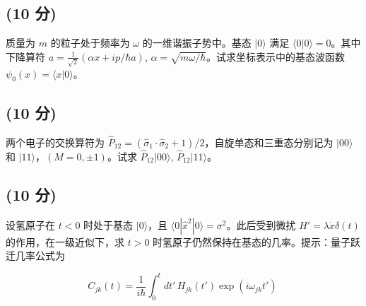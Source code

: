 \subsection{(10 分)}质量为 $m$ 的粒子处于频率为 $\omega$ 的一维谐振子势中。基态 $|0\rangle$ 满足 $\langle 0| 0\rangle = 0$。其中下降算符 $a = \frac{1}{\sqrt{2}} (\alpha x + ip/\hbar a)$, $\alpha = \sqrt{m\omega/\hbar}$。试求坐标表示中的基态波函数 $\psi_0(x) = \langle x| 0\rangle$。

\subsection{(10 分)}两个电子的交换算符为 $\hat{P}_{12} = (\hat{\sigma}_1\cdot \hat{\sigma}_2+1)/2$，自旋单态和三重态分别记为 $|00\rangle$ 和 $|11\rangle$，$(M = 0, \pm1)$。试求 $\hat{P}_{12}|00\rangle$, $\hat{P}_{12}|11\rangle$。

\subsection{(10 分)}设氢原子在 $t<0$ 时处于基态 $|0\rangle$，且 $\langle 0| \hat{x}^2 | 0\rangle = \sigma^2$。此后受到微扰 $H' = \lambda \dot{x} \delta(t)$ 的作用，在一级近似下，求 $t>0$ 时氢原子仍然保持在基态的几率。提示：量子跃迁几率公式为

$$C_{jk}(t) = \frac{1}{i\hbar} \int_0^t dt' \, H_{jk}(t') \exp(i\omega_{jk} t')~$$
